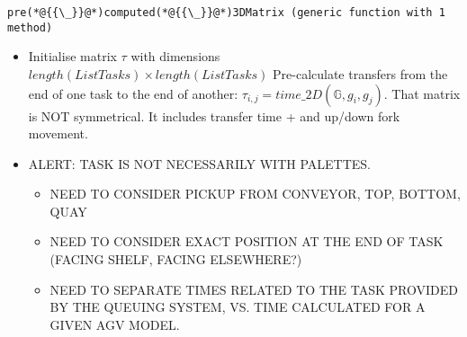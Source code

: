 \documentclass[12pt,a4paper]{article}
\begin{document}
\begin{lstlisting}
pre(*@{{\_}}@*)computed(*@{{\_}}@*)3DMatrix (generic function with 1 method)
\end{lstlisting}


\begin{itemize}
\item Initialise matrix $\tau$ with dimensions $length(ListTasks) \times length(ListTasks)$ Pre-calculate transfers from the end of one task to the end of another: $\tau_{i, j} = time\_2D(\mathbb{G}, g_i, g_j)$. That matrix is NOT symmetrical. It includes transfer time + and up/down fork movement.

\end{itemize}
\begin{itemize}
\item ALERT: TASK IS NOT NECESSARILY WITH PALETTES.

\begin{itemize}
\item NEED TO CONSIDER PICKUP FROM CONVEYOR, TOP, BOTTOM, QUAY


\item NEED TO CONSIDER EXACT POSITION AT THE END OF TASK (FACING SHELF, FACING ELSEWHERE?)


\item NEED TO SEPARATE TIMES RELATED TO THE TASK PROVIDED BY THE QUEUING SYSTEM, VS. TIME CALCULATED FOR A GIVEN AGV MODEL.

\end{itemize}
\end{itemize}
\end{document}
